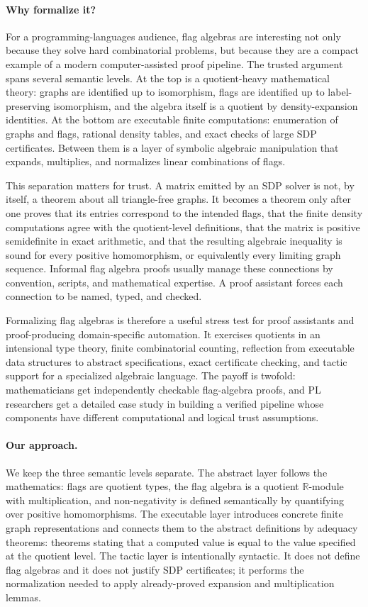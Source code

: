 \documentclass{article}
\begin{document}
\paragraph{Why formalize it?}
For a programming-languages audience, flag algebras are interesting not only
because they solve hard combinatorial problems, but because they are a
compact example of a modern computer-assisted proof pipeline.  The trusted
argument spans several semantic levels.  At the top is a quotient-heavy
mathematical theory: graphs are identified up to isomorphism, flags are
identified up to label-preserving isomorphism, and the algebra itself is a
quotient by density-expansion identities.  At the bottom are executable
finite computations: enumeration of graphs and flags, rational density tables,
and exact checks of large SDP certificates.  Between them is a layer of
symbolic algebraic manipulation that expands, multiplies, and normalizes
linear combinations of flags.

This separation matters for trust.  A matrix emitted by an SDP solver is not,
by itself, a theorem about all triangle-free graphs.  It becomes a theorem
only after one proves that its entries correspond to the intended flags, that
the finite density computations agree with the quotient-level definitions,
that the matrix is positive semidefinite in exact arithmetic, and that the
resulting algebraic inequality is sound for every positive homomorphism, or
equivalently every limiting graph sequence.  Informal flag algebra proofs
usually manage these connections by convention, scripts, and mathematical
expertise.  A proof assistant forces each connection to be named, typed, and
checked.

Formalizing flag algebras is therefore a useful stress test for proof
assistants and proof-producing domain-specific automation.  It exercises
quotients in an intensional type theory, finite combinatorial counting,
reflection from executable data structures to abstract specifications, exact
certificate checking, and tactic support for a specialized algebraic language.
The payoff is twofold: mathematicians get independently checkable
flag-algebra proofs, and PL researchers get a detailed case study in building
a verified pipeline whose components have different computational and logical
trust assumptions.

\paragraph{Our approach.}
We keep the three semantic levels separate.  The abstract layer follows the
mathematics: flags are quotient types, the flag algebra is a quotient
$\mathbb{R}$-module with multiplication, and non-negativity is defined
semantically by quantifying over positive homomorphisms.  The executable
layer introduces concrete finite graph representations and connects them to
the abstract definitions by adequacy theorems: theorems stating that a
computed value is equal to the value specified at the quotient level.  The
tactic layer is intentionally syntactic.  It does not define flag algebras
and it does not justify SDP certificates; it performs the normalization needed
to apply already-proved expansion and multiplication lemmas.
\end{document}
